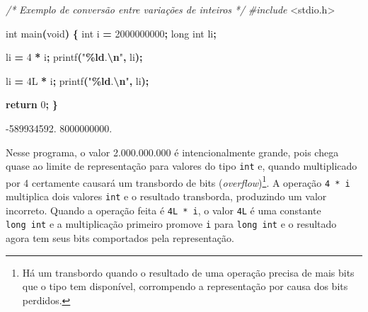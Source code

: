 \documentclass[
  11pt,
  a4paper,
]{scrbook}
\newenvironment{Shaded}{\begin{snugshade}}{\end{snugshade}}
\newcommand{\BuiltInTok}[1]{#1}
\newcommand{\CommentTok}[1]{\textcolor[rgb]{0.56,0.35,0.01}{\textit{#1}}}
\newcommand{\ControlFlowTok}[1]{\textcolor[rgb]{0.13,0.29,0.53}{\textbf{#1}}}
\newcommand{\DataTypeTok}[1]{\textcolor[rgb]{0.13,0.29,0.53}{#1}}
\newcommand{\DecValTok}[1]{\textcolor[rgb]{0.00,0.00,0.81}{#1}}
\newcommand{\ImportTok}[1]{#1}
\newcommand{\NormalTok}[1]{#1}
\newcommand{\OperatorTok}[1]{\textcolor[rgb]{0.81,0.36,0.00}{\textbf{#1}}}
\newcommand{\PreprocessorTok}[1]{\textcolor[rgb]{0.56,0.35,0.01}{\textit{#1}}}
\newcommand{\SpecialCharTok}[1]{\textcolor[rgb]{0.81,0.36,0.00}{\textbf{#1}}}
\newcommand{\StringTok}[1]{\textcolor[rgb]{0.31,0.60,0.02}{#1}}
\begin{document}
\begin{Shaded}
\begin{Highlighting}[]
\CommentTok{/*}
\CommentTok{Exemplo de conversão entre variações de inteiros}
\CommentTok{*/}
\PreprocessorTok{\#include }\ImportTok{\textless{}stdio.h\textgreater{}}

\DataTypeTok{int}\NormalTok{ main}\OperatorTok{(}\DataTypeTok{void}\OperatorTok{)} \OperatorTok{\{}
    \DataTypeTok{int}\NormalTok{ i }\OperatorTok{=} \DecValTok{2000000000}\OperatorTok{;}
    \DataTypeTok{long} \DataTypeTok{int}\NormalTok{ li}\OperatorTok{;}

\NormalTok{    li }\OperatorTok{=} \DecValTok{4} \OperatorTok{*}\NormalTok{ i}\OperatorTok{;}
\NormalTok{    printf}\OperatorTok{(}\StringTok{"}\SpecialCharTok{\%ld}\StringTok{.}\SpecialCharTok{\textbackslash{}n}\StringTok{"}\OperatorTok{,}\NormalTok{ li}\OperatorTok{);}

\NormalTok{    li }\OperatorTok{=} \DecValTok{4}\BuiltInTok{L} \OperatorTok{*}\NormalTok{ i}\OperatorTok{;}
\NormalTok{    printf}\OperatorTok{(}\StringTok{"}\SpecialCharTok{\%ld}\StringTok{.}\SpecialCharTok{\textbackslash{}n}\StringTok{"}\OperatorTok{,}\NormalTok{ li}\OperatorTok{);}

    \ControlFlowTok{return} \DecValTok{0}\OperatorTok{;}
\OperatorTok{\}}
\end{Highlighting}
\end{Shaded}

\begin{Shaded}
\begin{Highlighting}[]
\NormalTok{{-}589934592.}
\NormalTok{8000000000.}
\end{Highlighting}
\end{Shaded}

  Nesse programa, o
valor 2.000.000.000 é intencionalmente grande, pois chega quase ao
limite de representação para valores do tipo \texttt{int} e, quando
multiplicado por 4 certamente causará um transbordo de bits
(\emph{overflow})\footnote{Há um transbordo quando o resultado de uma
  operação precisa de mais bits que o tipo tem disponível, corrompendo a
  representação por causa dos bits perdidos.}. A operação
\texttt{4\ *\ i} multiplica dois valores \texttt{int} e o resultado
transborda, produzindo um valor incorreto. Quando a operação feita é
\texttt{4L\ *\ i}, o valor \texttt{4L} é uma constante
\texttt{long\ int} e a multiplicação primeiro promove \texttt{i} para
\texttt{long\ int} e o resultado agora tem seus bits comportados pela
representação.
\end{document}

